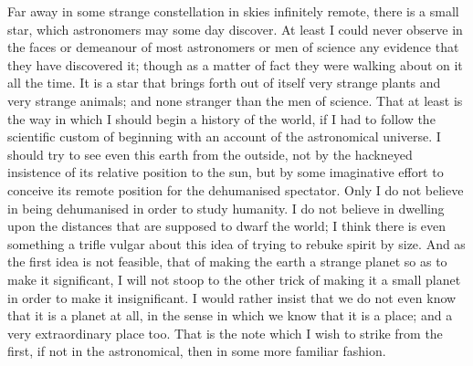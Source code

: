 

Far away in some strange constellation in skies infinitely remote, there is a small star, which astronomers may some day discover. At least I could never observe in the faces or demeanour of most astronomers or men of science any evidence that they have discovered it; though as a matter of fact they were walking about on it all the time. It is a star that brings forth out of itself very strange plants and very strange animals; and none stranger than the men of science. That at least is the way in which I should begin a history of the world, if I had to follow the scientific custom of beginning with an account of the astronomical universe. I should try to see even this earth from the outside, not by the hackneyed insistence of its relative position to the sun, but by some imaginative effort to conceive its remote position for the dehumanised spectator. Only I do not believe in being dehumanised in order to study humanity. I do not believe in dwelling upon the distances that are supposed to dwarf the world; I think there is even something a trifle vulgar about this idea of trying to rebuke spirit by size. And as the first idea is not feasible, that of making the earth a strange planet so as to make it significant, I will not stoop to the other trick of making it a small planet in order to make it insignificant. I would rather insist that we do not even know that it is a planet at all, in the sense in which we know that it is a place; and a very extraordinary place too. That is the note which I wish to strike from the first, if not in the astronomical, then in some more familiar fashion.

